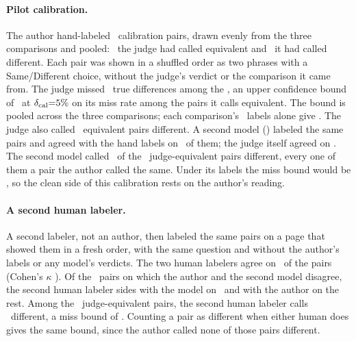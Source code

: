 \keeprunin
\paragraph{Pilot calibration.} The author hand-labeled
\pilotLabeled\ calibration pairs, drawn evenly from the three
comparisons and pooled: \pilotLabeledSame\ the judge had
called equivalent and \pilotLabeledDiff\ it had called different. Each
pair was shown in a shuffled order as two phrases with a Same/Different
choice, without the judge's verdict or the comparison it came from. The
judge missed \pilotMisses\ true differences among the \pilotLabeledSame,
an upper confidence bound of \pilotMissUcb\ at $\delta_{\mathrm{cal}}{=}5\%$ on its miss rate among the
pairs it calls equivalent.
The bound is pooled across the three comparisons; each comparison's
\pilotLabeledSamePerComparison\ labels alone give
\pilotMissUcbPerComparison. The judge also called
\pilotFalseFlips\ equivalent pairs
different. A second model (\pilotAdjudicator) labeled the same
pairs and agreed with the hand labels on \pilotAdjAgree\ of them; the
judge itself agreed on \pilotJudgeAgree. The second model called
\pilotAdjMissesOnJudgeSame\ of the \pilotLabeledSame\ judge-equivalent
pairs different, every one of them a pair the author called the same.
Under its labels the miss bound would be \pilotAdjMissUcb, so the clean
side of this calibration rests on the author's reading.

\keeprunin
\paragraph{A second human labeler.} A second labeler, not an author,
then labeled the same pairs on a page that showed them in a fresh order,
with the same question and without the author's labels or any model's
verdicts. The two human labelers agree on \pilotSecondAgree\ of the
pairs (Cohen's $\kappa$ \pilotSecondKappa). Of the \pilotSecondSplits\
pairs on which the author and the second model disagree, the second
human labeler sides with the model on \pilotSecondSidesModel\ and with
the author on the rest. Among the \pilotLabeledSame\ judge-equivalent
pairs, the second human labeler calls \pilotSecondMisses\ different, a
miss bound of \pilotSecondMissUcb. Counting a pair as different when
either human does gives the same bound, since the author called none of
those pairs different.

\keeprunin
